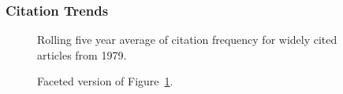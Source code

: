 \documentclass[
  10pt,
  letterpaper,
  DIV=11,
  numbers=noendperiod,
  twoside]{scrartcl}
\begin{document}
\subsubsection*{Citation Trends}\label{sec-trends-1979}

\begin{figure}


\caption{\label{fig-citation-spaghetti-1979}Rolling five year average of
citation frequency for widely cited articles from 1979.}

\end{figure}%

\begin{figure}


\caption{\label{fig-citation-facet-1979}Faceted version of
Figure~\ref{fig-citation-spaghetti-1979}.}

\end{figure}%
\end{document}
